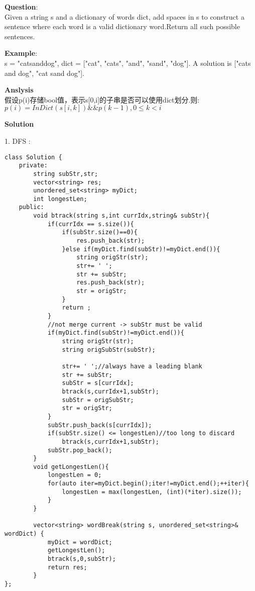     
\begin{description}
    \item{\textbf{Question}}:\\%
		Given a string s and a dictionary of words dict, add spaces in s to construct a sentence where each word is a valid dictionary word.Return all such possible sentences.
    \item{\textbf{Example}}:\\
		s = "catsanddog",
		dict = ["cat", "cats", "and", "sand", "dog"].
		A solution is ["cats and dog", "cat sand dog"].
    \item{\textbf{Anslysis}}\\
		假设p(i)存储bool值，表示s[0,i]的子串是否可以使用dict划分.则:\\
		$p(i)= InDict(s[i,k]) \&\& p(k-1), 0\leq k< i$

    \item{\textbf{Solution}}\\
	\item{1. DFS} : \\
		\begin{lstlisting}
class Solution {
	private:
		string subStr,str;
		vector<string> res;
		unordered_set<string> myDict;
		int longestLen;
	public:
		void btrack(string s,int currIdx,string& subStr){
			if(currIdx == s.size()){
				if(subStr.size()==0){
					res.push_back(str);
				}else if(myDict.find(subStr)!=myDict.end()){
					string origStr(str);
					str+= ' ';
					str += subStr;
					res.push_back(str);
					str = origStr;
				}
				return ;
			}
			//not merge current -> subStr must be valid
			if(myDict.find(subStr)!=myDict.end()){
				string origStr(str);
				string origSubStr(subStr);

				str+= ' ';//always have a leading blank 
				str += subStr;
				subStr = s[currIdx];
				btrack(s,currIdx+1,subStr);
				subStr = origSubStr;
				str = origStr;
			}
			subStr.push_back(s[currIdx]);
			if(subStr.size() <= longestLen)//too long to discard 
				btrack(s,currIdx+1,subStr);
			subStr.pop_back();
		}
		void getLongestLen(){
			longestLen = 0;
			for(auto iter=myDict.begin();iter!=myDict.end();++iter){
				longestLen = max(longestLen, (int)(*iter).size());
			}
		}

		vector<string> wordBreak(string s, unordered_set<string>& wordDict) {
			myDict = wordDict;
			getLongestLen();
			btrack(s,0,subStr);
			return res;
		}
};
		\end{lstlisting}


\end{description}

